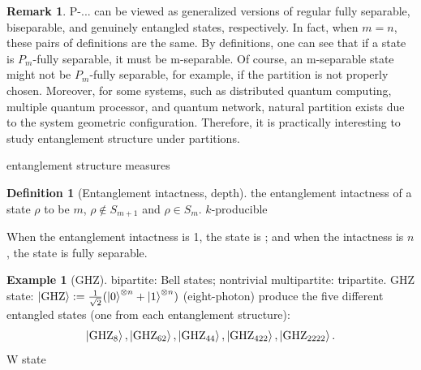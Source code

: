 \documentclass[
10pt,
aps,
pra,
linenumbers,
floatfix,
]{revtex4-2}
\theoremstyle{plain}
\theoremstyle{definition}
\newtheorem{definition}{Definition}
\newtheorem{example}{Example}
\newtheorem{remark}{Remark}
\newcommand{\ghz}{\text{GHZ}}
\newcommand{\dm}{\rho}
\begin{document}
\begin{remark}
	P-... can be viewed as generalized versions of regular fully separable, biseparable, and genuinely entangled states, respectively.
	In fact, when $m=n$, these pairs of definitions are the same.
	By definitions, one can see that if a state is $P_m$-fully separable, it must be m-separable. Of course, an m-separable state might not be $P_m$-fully separable, for example, if the partition is not properly chosen.
	Moreover, for some systems, such as distributed quantum computing, multiple quantum processor, and quantum network, natural partition exists due to the system geometric conﬁguration. Therefore, it is practically interesting to study entanglement structure under partitions.
\end{remark}
entanglement structure measures
\begin{definition}[Entanglement intactness, depth]
	the entanglement intactness of a state $\dm$ to be $m$, \iff $\dm\notin S_{m+1}$ and $\dm\in S_m$.
	$k$-producible
\end{definition}

	When the entanglement intactness is 1, the state is ; and when the intactness is $n$, the state is fully separable.
\begin{example}[GHZ]\label{exm:ghz}
	bipartite: Bell states;
	nontrivial multipartite: tripartite.
	GHZ state: $\ket{\ghz}:=\frac{1}{\sqrt{2}}(\ket{0}^{\otimes n} + \ket{1}^{\otimes n} )$ (eight-photon) produce the five different entangled states (one from each entanglement structure): 
	\begin{equation*}
		\ket{\ghz_8},\ket{\ghz_{62}},\ket{\ghz_{44}},\ket{\ghz_{422}},\ket{\ghz_{2222}}.
	\end{equation*}
	W state
\end{example}
\end{document}

